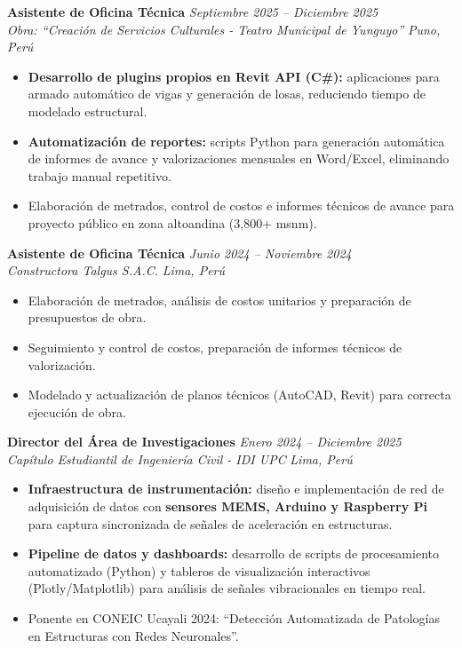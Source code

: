 \documentclass[10pt, a4paper]{article}
\newcommand{\entry}[4]{
    \textbf{#1} \hfill \textit{#2} \\
    \textit{#3} \hfill \textit{#4} \\
    \vspace{-1.5mm}
}
\begin{document}
\entry{Asistente de Oficina Técnica}{Septiembre 2025 – Diciembre 2025}{Obra: ``Creación de Servicios Culturales - Teatro Municipal de Yunguyo''}{Puno, Perú}
\begin{itemize}
    \item \textbf{Desarrollo de plugins propios en Revit API (C\#):} aplicaciones para armado automático de vigas y generación de losas, reduciendo tiempo de modelado estructural.
    \item \textbf{Automatización de reportes:} scripts Python para generación automática de informes de avance y valorizaciones mensuales en Word/Excel, eliminando trabajo manual repetitivo.
    \item Elaboración de metrados, control de costos e informes técnicos de avance para proyecto público en zona altoandina (3,800+ msnm).
\end{itemize}

\vspace{1mm}

\entry{Asistente de Oficina Técnica}{Junio 2024 – Noviembre 2024}{Constructora Talgus S.A.C.}{Lima, Perú}
\begin{itemize}
    \item Elaboración de metrados, análisis de costos unitarios y preparación de presupuestos de obra.
    \item Seguimiento y control de costos, preparación de informes técnicos de valorización.
    \item Modelado y actualización de planos técnicos (AutoCAD, Revit) para correcta ejecución de obra.
\end{itemize}

\vspace{1mm}

\entry{Director del Área de Investigaciones}{Enero 2024 – Diciembre 2025}{Capítulo Estudiantil de Ingeniería Civil - IDI UPC}{Lima, Perú}
\begin{itemize}
    \item \textbf{Infraestructura de instrumentación:} diseño e implementación de red de adquisición de datos con \textbf{sensores MEMS, Arduino y Raspberry Pi} para captura sincronizada de señales de aceleración en estructuras.
    \item \textbf{Pipeline de datos y dashboards:} desarrollo de scripts de procesamiento automatizado (Python) y tableros de visualización interactivos (Plotly/Matplotlib) para análisis de señales vibracionales en tiempo real.
    \item Ponente en CONEIC Ucayali 2024: ``Detección Automatizada de Patologías en Estructuras con Redes Neuronales''.
\end{itemize}
\end{document}
